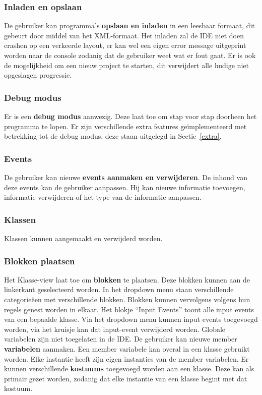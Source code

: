 \documentclass[]{article}
\begin{document}
\subsubsection{Inladen en opslaan}
De gebruiker kan programma's \textbf{opslaan en inladen} in een leesbaar formaat, dit gebeurt door middel van het XML-formaat. Het inladen zal de IDE niet doen crashen op een verkeerde layout, er kan wel een eigen error message uitgeprint worden naar de console zodanig dat de gebruiker weet wat er fout gaat. Er is ook de mogelijkheid om een nieuw project te starten, dit verwijdert alle hudige niet opgeslagen progressie.

\subsubsection{Debug modus}
Er is een \textbf{debug modus} aanwezig. Deze laat toe om stap voor stap doorheen het programma te lopen. Er zijn verschillende extra features ge\"implementeerd met betrekking tot de debug modus, deze staan uitgelegd in Sectie~\ref{extra}.
\subsubsection{Events}
De gebruiker kan nieuwe \textbf{events aanmaken en verwijderen}. De inhoud van deze events kan de gebruiker aanpassen. Hij kan nieuwe informatie toevoegen, informatie verwijderen of het type van de informatie aanpassen.

\subsubsection{Klassen}
Klassen kunnen aangemaakt en verwijderd worden.

\subsubsection{Blokken plaatsen}
Het Klasse-view laat toe om \textbf{blokken} te plaatsen. Deze blokken kunnen aan de linkerkant geselecteerd worden. In het dropdown menu staan verschillende categorie\"een met verschillende blokken. Blokken kunnen vervolgens volgens hun regels genest worden in elkaar. Het blokje ``Input Events'' toont alle input events van een bepaalde klasse. Via het dropdown menu kunnen input events toegevoegd worden, via het kruisje kan dat input-event verwijderd worden. Globale variabelen zijn niet toegelaten in de IDE. De gebruiker kan nieuwe member \textbf{variabelen} aanmaken. Een member variabele kan overal in een klasse gebruikt worden. Elke instantie heeft zijn eigen instanties van de member variabelen. Er kunnen verschillende \textbf{kostuums} toegevoegd worden aan een klasse. Deze kan als primair gezet worden, zodanig dat elke instantie van een klasse begint met dat kostuum.
\end{document}
